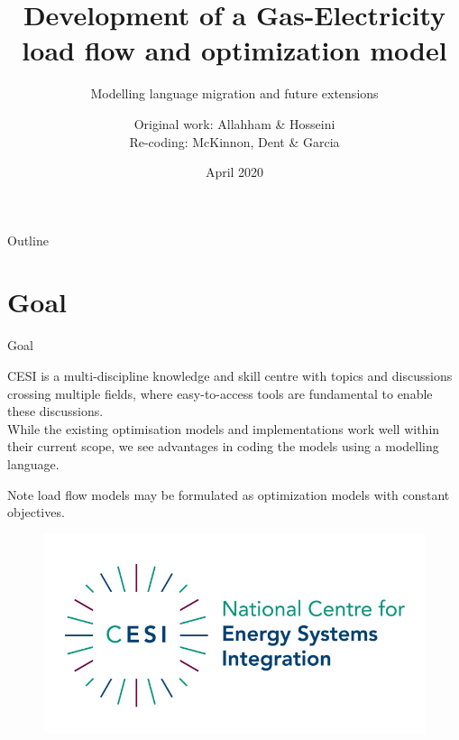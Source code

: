 \documentclass[handout]{beamer}
\title[Development of a Coordinated Gas-Electricity optimisation model]{\normalsize{Development of a Gas-Electricity load flow and optimization model}}
\subtitle{\small{Modelling language migration and future extensions}}
\author{\texorpdfstring{Original work: }{}Allahham \& Hosseini \texorpdfstring{\\Re-coding: }{}McKinnon, Dent \& Garcia}
\institute{National Centre for Energy System Integration (CESI)}
\date{April 2020}
\begin{document}
\begin{frame}
  \titlepage
\end{frame}

\begin{frame}{Outline}
  \tableofcontents
\end{frame}


\section{Goal}

\begin{frame}[t]{Goal}

  CESI is a multi-discipline knowledge and skill centre with topics and discussions crossing multiple fields, where easy-to-access tools are fundamental to enable these discussions.\\[12pt]

  While the existing optimisation models and implementations work well within their current scope, we see advantages in coding the models using a modelling language.
  
  Note load flow models may be formulated as optimization models with constant objectives.

  \begin{figure}
  \begin{center}
  \includegraphics[width=.60\textwidth]{CESI.png}
  \end{center}
  \end{figure}

\end{frame}


\end{document}
